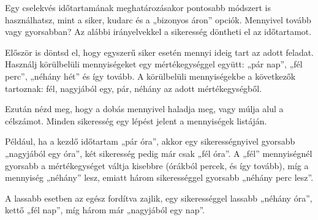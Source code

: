 Egy cselekvés időtartamának meghatározásakor pontosabb módszert is használhatsz, mint a siker, kudarc és a „bizonyos áron” opciók. Mennyivel tovább vagy gyorsabban? Az alábbi irányelvekkel a sikeresség döntheti el az időtartamot.

Először is döntsd el, hogy egyszerű siker esetén mennyi ideig tart az adott feladat. Használj körülbelüli mennyiségeket egy mértékegységgel együtt: „pár nap”, „fél perc”, „néhány hét” és így tovább. A körülbelüli mennyiségekbe a következők tartoznak: fél, nagyjából egy, pár, néhány az adott mértékegységből.

Ezután nézd meg, hogy a dobás mennyivel haladja meg, vagy múlja alul a célszámot. Minden sikeresség egy lépést jelent a mennyiségek listáján.

Például, ha a kezdő időtartam „pár óra”, akkor egy sikerességnyivel gyorsabb „nagyjából egy óra”, két sikeresség pedig már csak „fél óra”. A „fél” mennyiségnél gyorsabb a mértékegységet váltja kisebbre (órákból percek, és így tovább), míg a mennyiség „néhány” lesz, emiatt három sikerességgel gyorsabb „néhány perc lesz”.

A lassabb esetben az egész fordítva zajlik, egy sikerességgel lassabb „néhány óra”, kettő „fél nap”, míg három már „nagyjából egy nap”.
